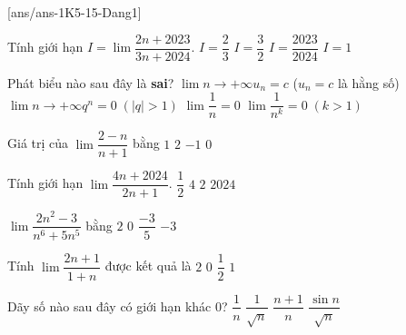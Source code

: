 [ans/ans-1K5-15-Dang1]
\begin{ex}%
	Tính giới hạn $I=\lim\dfrac{2n+2023}{3n+2024}$. 
	\choice
	{\True $I=\dfrac{2}{3}$}
	{$I=\dfrac{3}{2}$}
	{$I=\dfrac{2023}{2024}$}
	{$I=1$}
\end{ex}
\begin{ex}%
	Phát biểu nào sau đây là \textbf{sai}?
	\choice
	{$\lim \limits{n \to +\infty}u_n=c$ ($u_n=c$ là hằng số)}
	{\True $\lim \limits{n \to +\infty}q^n=0 \;(|q|>1)$}
	{$\lim\dfrac{1}{n}=0$}
	{$\lim\dfrac{1}{n^k}=0 \; (k>1)$}
\end{ex}
\begin{ex}%
	Giá trị của $\lim\dfrac{2-n}{n+1}$ bằng
	\choice
	{$1$}
	{$2$}
	{\True $-1$}
	{$0$}
\end{ex}
\begin{ex}%
	Tính giới hạn $\lim\dfrac{4n+2024}{2n+1}$. 
	\choice
	{$\dfrac{1}{2}$}
	{$4$}
	{\True $2$}
	{$2024$}
\end{ex}
\begin{ex}%
	$\lim\dfrac{2n^2-3}{n^6+5n^5}$ bằng 
	\choice
	{$2$}
	{\True $0$}
	{$\dfrac{-3}{5}$}
	{$-3$}
\end{ex}
\begin{ex}%
	Tính $\lim\dfrac{2n+1}{1+n}$ được kết quả là
	\choice
	{\True $2$}
	{$0$}
	{$\dfrac{1}{2}$}
	{$1$}
\end{ex}

\begin{ex}%
	Dãy số nào sau đây có giới hạn khác $0$?
	\choice
	{$\dfrac{1}{n}$}
	{$\dfrac{1}{\sqrt{n}}$}
	{\True $\dfrac{n+1}{n}$}
	{$\dfrac{\sin n}{\sqrt{n}}$}
\end{ex}


